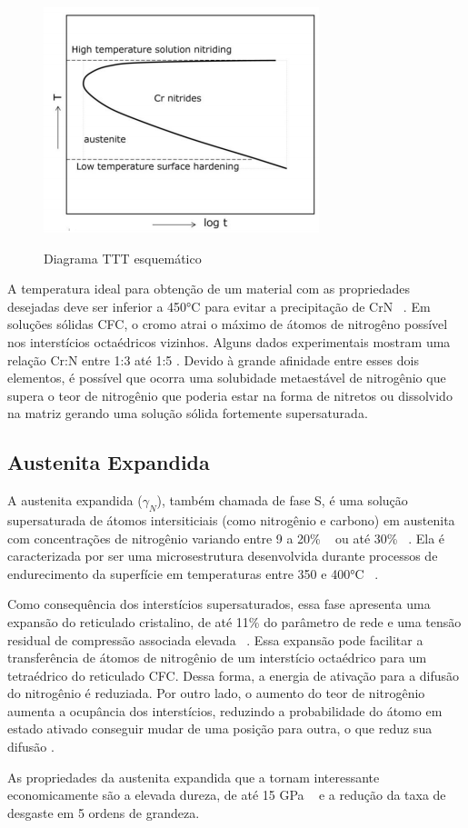 \documentclass[]{politex}
\begin{document}
	\begin{figure}[ht]
	\caption{Diagrama TTT esquemático}
	\includegraphics{TTTN}
	\label{fig:TTTN}
	\centering
	\end{figure}
	
	A temperatura ideal para obtenção de um material com as propriedades desejadas deve ser inferior a 450°C para evitar a precipitação de CrN ~\cite{moskalioviene2011modeling}.
	Em soluções sólidas CFC, o cromo atrai o máximo de átomos de nitrogêno possível nos interstícios octaédricos vizinhos. Alguns dados experimentais mostram uma relação Cr:N entre 1:3 até 1:5 \cite{somers2018expanded}. Devido à grande afinidade entre esses dois elementos, é possível que ocorra uma solubidade metaestável de nitrogênio que supera o teor de nitrogênio que poderia estar na forma de nitretos ou dissolvido na matriz gerando uma solução sólida fortemente supersaturada.
	
\FloatBarrier

\subsection{Austenita Expandida}
	A austenita expandida ($\gamma_{N}$), também chamada de fase S,  é uma solução supersaturada de átomos intersiticiais (como nitrogênio e carbono) em austenita com concentrações de nitrogênio variando entre 9 a 20\%  ~\cite{williamson1994metastable} ou até 30\% ~\cite{moskalioviene2011modeling}. Ela é caracterizada por ser uma microsestrutura desenvolvida durante processos de endurecimento da superfície em temperaturas entre 350 e 400°C ~\cite{mandl2003nitrogen}. \par
	Como consequência dos interstícios supersaturados, essa fase apresenta uma expansão do reticulado cristalino, de até 11\% do parâmetro de rede e uma tensão residual de compressão associada elevada ~\cite{somers2018expanded}. Essa expansão pode facilitar a transferência de átomos de nitrogênio de um interstício octaédrico para um tetraédrico do reticulado CFC. Dessa forma, a energia de ativação para a difusão do nitrogênio é reduziada. Por outro lado, o aumento do teor de nitrogênio aumenta a ocupância dos interstícios, reduzindo a probabilidade do átomo em estado ativado conseguir mudar de uma posição para outra, o que reduz sua difusão \cite{christiansen2008nitrogen}. \par
	As propriedades da austenita expandida que a tornam interessante economicamente são a elevada dureza, de até 15 GPa ~\cite{mandl2003nitrogen} e a redução da taxa de desgaste em 5 ordens de grandeza.
\end{document}
